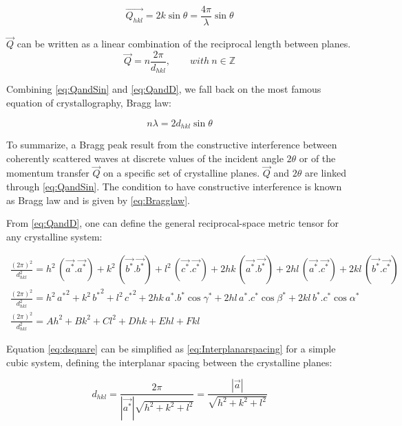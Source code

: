 \begin{equation}
\label{eq:QandSin}
    \vec{Q_{hkl}}=2k\sin{\theta}=\frac{4\pi}{\lambda} \sin{\theta}
\end{equation}

$\vec{Q}$ can be written as a linear combination of the reciprocal length between planes.
\begin{equation}
    \label{eq:QandD}
    \vec{Q} = n\frac{2\pi}{d_{hkl}}, \qquad with \ n \in \mathbb{Z}
\end{equation}{}

Combining \eqref{eq:QandSin} and \eqref{eq:QandD}, we fall back on the most famous equation of crystallography, Bragg law:

\begin{equation}
    \label{eq:Bragglaw}
    n\lambda = 2d_{hkl} \sin{\theta}
\end{equation}

To summarize, a Bragg peak result from the constructive interference between coherently scattered waves at discrete values of the incident angle $2\theta$ or of the momentum transfer $\vec{Q}$ on a specific set of crystalline planes. $\vec{Q}$ and $2\theta$ are linked through \eqref{eq:QandSin}. The condition to have constructive interference is known as Bragg law and is given by \eqref{eq:Bragglaw}.

From \eqref{eq:QandD}, one can define the general reciprocal-space metric tensor for any crystalline system:

\begin{gather}
    \frac{(2\pi)^2}{d_{hkl}^2} = h^2 \, (\Vec{a^*}.\Vec{a^*}) + k^2 \,
    \label{eq:dsquare}(\Vec{b^*}.\Vec{b^*}) + l^2 \, (\Vec{c^*}.\Vec{c^*}) + 2hk \, (\Vec{a^*}.\Vec{b^*}) + 2hl \, (\Vec{a^*}.\Vec{c^*}) + 2kl \, (\Vec{b^*}.\Vec{c^*})\\
     \frac{(2\pi)^2}{d_{hkl}^2} = h^2 \, {a^*}^2 + k^2 \, {b^*}^2 + l^2 \, {c^*}^2 + 2hk \, {a^*}.{b^*}\cos{\gamma^*} + 2hl \, {a^*}.{c^*}\cos{\beta^*} + 2kl \, {b^*}.{c^*}\cos{\alpha^*}\\
     \frac{(2\pi)^2}{d_{hkl}^2} = Ah^2 + Bk^2 + Cl^2 + Dhk + Ehl + Fkl
     \label{eq:RecSpaceMetricTensor}
\end{gather}{}

Equation \eqref{eq:dsquare} can be simplified as \eqref{eq:Interplanarspacing} for a simple cubic system, defining the interplanar spacing between the crystalline planes:

\begin{equation}
    \label{eq:Interplanarspacing}
    d_{hkl}=\frac{2\pi}{|\vec{a^*}|\sqrt{h^2 + k^2 + l^2}}=\frac{|\vec{a}|}{\sqrt{h^2 + k^2 + l^2}}
\end{equation}{}

